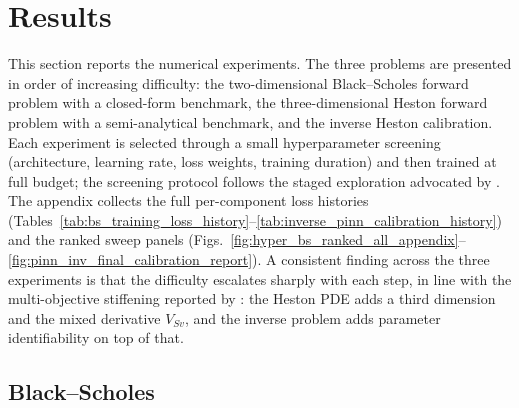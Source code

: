 \section{Results}\label{section:result}

This section reports the numerical experiments. The three problems are presented in order of increasing difficulty: the two-dimensional Black--Scholes forward problem with a closed-form benchmark, the three-dimensional Heston forward problem with a semi-analytical benchmark, and the inverse Heston calibration. Each experiment is selected through a small hyperparameter screening (architecture, learning rate, loss weights, training duration) and then trained at full budget; the screening protocol follows the staged exploration advocated by \textcite{wang2022expert}. The appendix collects the full per-component loss histories (Tables~\ref{tab:bs_training_loss_history}--\ref{tab:inverse_pinn_calibration_history}) and the ranked sweep panels (Figs.~\ref{fig:hyper_bs_ranked_all_appendix}--\ref{fig:pinn_inv_final_calibration_report}). A consistent finding across the three experiments is that the difficulty escalates sharply with each step, in line with the multi-objective stiffening reported by \textcite{krishnapriyan2021characterizing,wang2021understanding}: the Heston PDE adds a third dimension and the mixed derivative $V_{Sv}$, and the inverse problem adds parameter identifiability on top of that.

\subsection{Black--Scholes}\label{subsec:results-bs}

